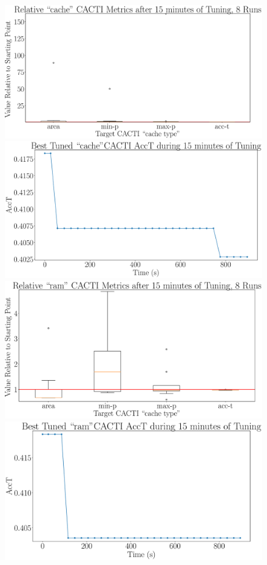 \documentclass[12pt, a4paper]{article}
\begin{document}
\begin{figure}[htpb]
    \centering
    \begin{minipage}{.48\textwidth}
        \centering
        \includegraphics[width=.8\textwidth]{target_acct_900_cache}
    \end{minipage}%
    \begin{minipage}{.48\textwidth}
        \centering
        \includegraphics[width=.8\textwidth]{target_acct_900_cache_best}
    \end{minipage}%

    \begin{minipage}{.48\textwidth}
        \centering
        \includegraphics[width=.8\textwidth]{target_acct_900_ram}
    \end{minipage}%
    \begin{minipage}{.48\textwidth}
        \centering
        \includegraphics[width=.8\textwidth]{target_acct_900_ram_best}
    \end{minipage}%


\end{figure}
\end{document}
